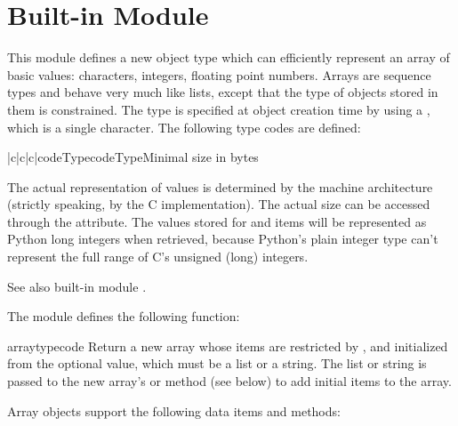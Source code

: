 \section{Built-in Module }
\label{module-array}

This module defines a new object type which can efficiently represent
an array of basic values: characters, integers, floating point
numbers.  Arrays are sequence types and behave very much like lists,
except that the type of objects stored in them is constrained.  The
type is specified at object creation time by using a ,
which is a single character.  The following type codes are defined:

\begin{tableiii}{|c|c|c|}{code}{Typecode}{Type}{Minimal size in bytes}
\end{tableiii}

The actual representation of values is determined by the machine
architecture (strictly speaking, by the C implementation).  The actual
size can be accessed through the  attribute.  The values
stored  for  and  items will be represented as
Python long integers when retrieved, because Python's plain integer
type can't represent the full range of C's unsigned (long) integers.

See also built-in module .

The module defines the following function:

\renewcommand{\indexsubitem}{(in module array)}

\begin{funcdesc}{array}{typecode}
Return a new array whose items are restricted by , and
initialized from the optional  value, which must be a
list or a string.  The list or string is passed to the new array's
 or  method (see below) to add
initial items to the array.
\end{funcdesc}

Array objects support the following data items and methods:

